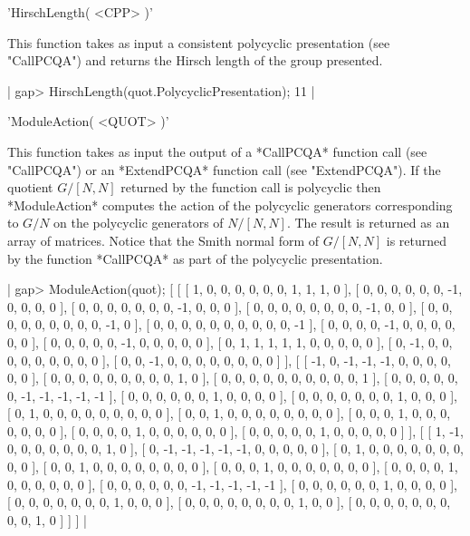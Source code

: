 

'HirschLength( <CPP> )'

This function takes as  input a  consistent polycyclic presentation  (see
"CallPCQA") and returns the Hirsch length of the group presented.

|
    gap> HirschLength(quot.PolycyclicPresentation);
    11
|



'ModuleAction( <QUOT> )'

This function  takes as input the   output of a *CallPCQA*  function call
(see "CallPCQA") or an *ExtendPCQA* function call (see "ExtendPCQA").  If
the quotient $G/[N,N]$  returned by the function  call is polycyclic then
*ModuleAction*   computes the  action    of  the  polycyclic   generators
corresponding to $G/N$ on  the polycyclic generators  of $N/[N,N]$.   The
result is returned as an array of matrices.  Notice that the Smith normal
form of  $G/[N,N]$ is returned by the  function *CallPCQA* as part of the
polycyclic presentation.

|
gap> ModuleAction(quot);
[ [ [ 1, 0, 0, 0, 0, 0, 0, 1, 1, 1, 0 ],
    [ 0, 0, 0, 0, 0, 0, -1, 0, 0, 0, 0 ],
    [ 0, 0, 0, 0, 0, 0, 0, -1, 0, 0, 0 ], 
    [ 0, 0, 0, 0, 0, 0, 0, 0, -1, 0, 0 ], 
    [ 0, 0, 0, 0, 0, 0, 0, 0, 0, -1, 0 ], 
    [ 0, 0, 0, 0, 0, 0, 0, 0, 0, 0, -1 ], 
    [ 0, 0, 0, 0, -1, 0, 0, 0, 0, 0, 0 ], 
    [ 0, 0, 0, 0, 0, -1, 0, 0, 0, 0, 0 ], 
    [ 0, 1, 1, 1, 1, 1, 0, 0, 0, 0, 0 ], 
    [ 0, -1, 0, 0, 0, 0, 0, 0, 0, 0, 0 ], 
    [ 0, 0, -1, 0, 0, 0, 0, 0, 0, 0, 0 ] ], 
  [ [ -1, 0, -1, -1, -1, 0, 0, 0, 0, 0, 0 ], 
    [ 0, 0, 0, 0, 0, 0, 0, 0, 0, 1, 0 ],
    [ 0, 0, 0, 0, 0, 0, 0, 0, 0, 0, 1 ],
    [ 0, 0, 0, 0, 0, 0, -1, -1, -1, -1, -1 ], 
    [ 0, 0, 0, 0, 0, 0, 1, 0, 0, 0, 0 ],
    [ 0, 0, 0, 0, 0, 0, 0, 1, 0, 0, 0 ],
    [ 0, 1, 0, 0, 0, 0, 0, 0, 0, 0, 0 ], 
    [ 0, 0, 1, 0, 0, 0, 0, 0, 0, 0, 0 ],
    [ 0, 0, 0, 1, 0, 0, 0, 0, 0, 0, 0 ],
    [ 0, 0, 0, 0, 1, 0, 0, 0, 0, 0, 0 ], 
    [ 0, 0, 0, 0, 0, 1, 0, 0, 0, 0, 0 ] ], 
  [ [ 1, -1, 0, 0, 0, 0, 0, 0, 0, 1, 0 ], 
    [ 0, -1, -1, -1, -1, -1, 0, 0, 0, 0, 0 ], 
    [ 0, 1, 0, 0, 0, 0, 0, 0, 0, 0, 0 ],
    [ 0, 0, 1, 0, 0, 0, 0, 0, 0, 0, 0 ],
    [ 0, 0, 0, 1, 0, 0, 0, 0, 0, 0, 0 ], 
    [ 0, 0, 0, 0, 1, 0, 0, 0, 0, 0, 0 ], 
    [ 0, 0, 0, 0, 0, 0, -1, -1, -1, -1, -1 ], 
    [ 0, 0, 0, 0, 0, 0, 1, 0, 0, 0, 0 ],
    [ 0, 0, 0, 0, 0, 0, 0, 1, 0, 0, 0 ],
    [ 0, 0, 0, 0, 0, 0, 0, 0, 1, 0, 0 ], 
    [ 0, 0, 0, 0, 0, 0, 0, 0, 0, 1, 0 ] ] ]
|


